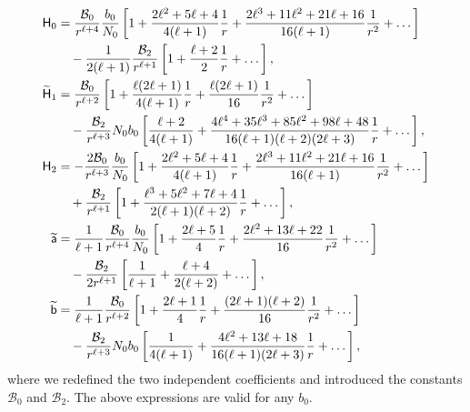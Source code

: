 \documentclass[aps,prd,preprintnumbers,superscriptaddress,nofootinbib,notitlepage]{revtex4-2}
\begin{document}
\begin{align}
\mathsf{H}_0&=\frac{\mathcal B_0}{r^{\ell+4}}\frac{b_0}{N_0}\left[1+\frac{2\ell^2+5\ell+4}{4(\ell+1)}\frac{1}{r}+\frac{2\ell^3+11\ell^2+21\ell+16}{16(\ell+1)}\frac{1}{r^2}+\dots\right]\notag\\
&\quad-\frac{1}{2(\ell+1)}\frac{\mathcal B_2}{r^{\ell+1}}\left[1+\frac{\ell +2}{2}\frac{1}{r}+\dots\right],\label{sol:H0_l>2}\\
%
  \widetilde{\mathsf{H}}_1&=\frac{\mathcal B_0}{r^{\ell+2}}\left[1+\frac{\ell(2\ell+1)}{4(\ell+1)}\frac{1}{r}+\frac{\ell(2\ell+1)}{16}\frac{1}{r^2}+\dots\right]\notag\\
  &\quad -\frac{\mathcal B_2}{r^{\ell+3}}N_0 b_0\left[\frac{\ell+2}{4(\ell+1)}+\frac{4\ell^4+35\ell^3+85\ell^2+98\ell+48}{16(\ell+1)(\ell+2)(2\ell+3)}\frac{1}{r}+\dots\right],\label{sol:H1_l>2}\\
  \mathsf H_2&=-\frac{2\mathcal B_0}{r^{\ell+3}}\frac{b_0}{N_0}\left[1+\frac{2\ell^2+5\ell+4}{4(\ell+1)}\frac{1}{r}+\frac{2\ell^3+11\ell^2+21\ell+16}{16(\ell+1)}\frac{1}{r^2}+\dots\right]\notag\\
&\quad +\frac{\mathcal B_2}{r^{\ell+1}}\left[1+\frac{\ell^3+5\ell^2+7\ell+4}{2(\ell+1)(\ell+2)}\frac{1}{r}+\dots\right],\label{sol:H2_l>2}\\
%
  \widetilde{\mathsf{a}}&=\frac{1}{\ell+1}\frac{\mathcal B_0}{r^{\ell+4}}\frac{b_0}{N_0}\left[1+\frac{2\ell+5}{4}\frac{1}{r}+\frac{2\ell^2+13\ell+22}{16}\frac{1}{r^2}+\dots\right]\notag\\
  &\quad -\frac{\mathcal B_2}{2r^{\ell+1}}\left[\frac{1}{\ell+1}+\frac{\ell+4}{2(\ell+2)}+\dots\right],\label{sol:a_l>2}\\
  \widetilde{\mathsf{b}}&=\frac{1}{\ell+1}\frac{\mathcal B_0}{r^{\ell+2}}\left[1+\frac{2\ell+1}{4}\frac{1}{r}+\frac{(2\ell+1)(\ell+2)}{16}\frac{1}{r^2}+\dots\right]\notag\\
  &\quad -\frac{\mathcal B_2}{r^{\ell+3}}N_0b_0\left[\frac{1}{4(\ell+1)}+\frac{4\ell^2+13\ell+18}{16(\ell+1)(2\ell+3)}\frac{1}{r}+\dots\right],\label{sol:b_l>2}
\end{align}
where we redefined the two independent coefficients and introduced the constants $\mathcal B_0$ and $\mathcal B_2$. The above expressions are valid for any $b_0$.
\end{document}
